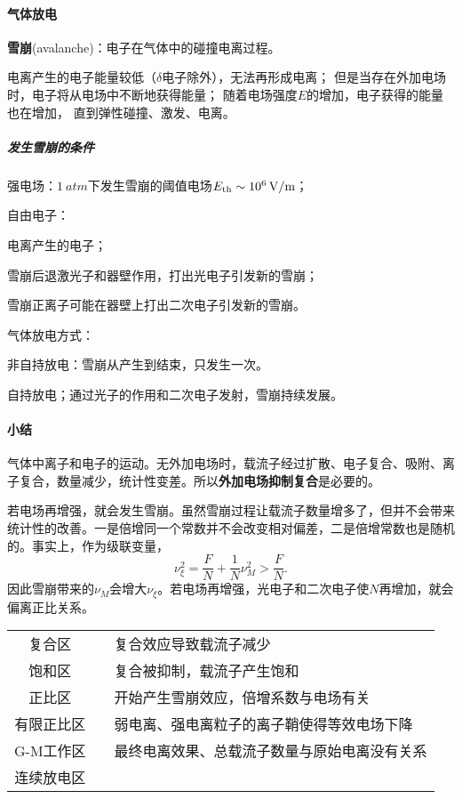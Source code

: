 \paragraph{气体放电}
\textbf{雪崩}(avalanche)：电子在气体中的碰撞电离过程。

电离产生的电子能量较低（$\delta$电子除外），无法再形成电离；
但是当存在外加电场时，电子将从电场中不断地获得能量；
随着电场强度$E$的增加，电子获得的能量也在增加，%
直到弹性碰撞、激发、电离。
\subparagraph{发生雪崩的条件}
\begin{compactenum}
	\item 强电场：$\SI{1}{atm}$下发生雪崩的阈值电场$E_{\mathrm{th}}\sim\SI{e6}{V/m}$；
	\item 自由电子：
	\begin{compactenum}
		\item 电离产生的电子；
		\item 雪崩后退激光子和器壁作用，打出光电子引发新的雪崩；
		\item 雪崩正离子可能在器壁上打出二次电子引发新的雪崩。
	\end{compactenum}
\end{compactenum}
气体放电方式：
\begin{compactitem}
	\item 非自持放电：雪崩从产生到结束，只发生一次。
	\item 自持放电；通过光子的作用和二次电子发射，雪崩持续发展。
\end{compactitem}
\paragraph{小结}气体中离子和电子的运动。无外加电场时，载流子经过扩散、电子复合、吸附、离子复合，数量减少，统计性变差。所以\textbf{外加电场抑制复合}是必要的。

若电场再增强，就会发生雪崩。虽然雪崩过程让载流子数量增多了，但并不会带来统计性的改善。一是倍增同一个常数并不会改变相对偏差，二是倍增常数也是随机的。事实上，作为级联变量，
\[
	\nu_\xi^2=\frac FN+\frac1N\nu_M^2>\frac FN.
\]
因此雪崩带来的$\nu_M$会增大$\nu_\xi$。若电场再增强，光电子和二次电子使$N$再增加，就会偏离正比关系。
\newpage
\begin{center}
	\begin{tabular}{ccl}
		\toprule
		复合区&&复合效应导致载流子减少\\
		饱和区&\checkmark&复合被抑制，载流子产生饱和\\
		正比区&\checkmark&开始产生雪崩效应，倍增系数与电场有关\\
		有限正比区&&弱电离、强电离粒子的离子鞘使得等效电场下降\\
		G-M工作区&\checkmark&最终电离效果、总载流子数量与原始电离没有关系\\
		连续放电区\\
		\bottomrule
	\end{tabular}
\end{center}
